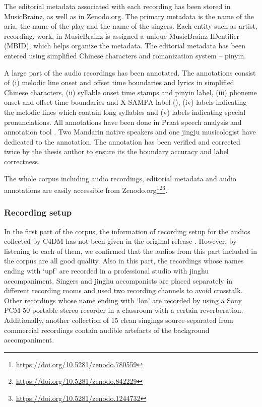 The editorial metadata associated with each recording has been stored in MusicBrainz, as well as in Zenodo.org. The primary metadata is the name of the aria, the name of the play and the name of the singers. Each entity such as artist, recording, work, in MusicBrainz is assigned a unique MusicBrainz IDentifier (MBID), which helps organize the metadata. The editorial metadata has been entered using simplified Chinese characters and romanization system -- pinyin. 

A large part of the audio recordings has been annotated. The annotations consist of (i) melodic line onset and offset time boundaries and lyrics in simplified Chinese characters, (ii) syllable onset time stamps and pinyin label, (iii) phoneme onset and offset time boundaries and X-SAMPA label (), (iv) labels indicating the melodic lines which contain long syllables and (v) labels indicating special pronunciations. All annotations have been done in Praat speech analysis and annotation tool \cite{boersma_praat_2001}. Two Mandarin native speakers and one jingju musicologist have dedicated to the annotation. The annotation has been verified and corrected twice by the thesis author to ensure its the boundary accuracy and label correctness.

The whole corpus including audio recordings, editorial metadata and audio annotations are easily accessible from Zenodo.org\footnote{\url{https://doi.org/10.5281/zenodo.780559}}\footnote{\url{https://doi.org/10.5281/zenodo.842229}}\footnote{\url{https://doi.org/10.5281/zenodo.1244732}}.

\subsubsection{Recording setup}\label{sec:ch4:recording_setup}

In the first part of the corpus, the information of recording setup for the audios collected by C4DM has not been given in the original release \cite{Black2014}. However, by listening to each of them, we confirmed that the audios from this part included in the corpus are all good quality. Also in this part, the recordings whose names ending with ‘upf’ are recorded in a professional studio with jinghu accompaniment. Singers and jinghu accompanists are placed separately in different recording rooms and used two recording channels to avoid crosstalk. Other recordings whose name ending with ‘lon’ are recorded by using a Sony PCM-50 portable stereo recorder in a classroom with a certain reverberation. Additionally, another collection of 15 clean singings source-separated from commercial recordings contain audible artefacts of the background accompaniment.

